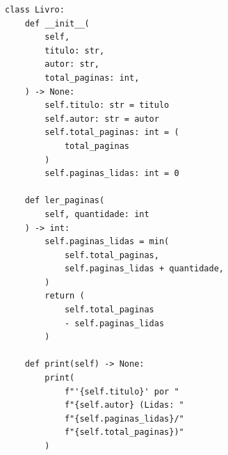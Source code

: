 \ifmostrarGabarito
\begin{verbatim}
class Livro:
    def __init__(
        self,
        titulo: str,
        autor: str,
        total_paginas: int,
    ) -> None:
        self.titulo: str = titulo
        self.autor: str = autor
        self.total_paginas: int = (
            total_paginas
        )
        self.paginas_lidas: int = 0

    def ler_paginas(
        self, quantidade: int
    ) -> int:
        self.paginas_lidas = min(
            self.total_paginas,
            self.paginas_lidas + quantidade,
        )
        return (
            self.total_paginas
            - self.paginas_lidas
        )

    def print(self) -> None:
        print(
            f"'{self.titulo}' por "
            f"{self.autor} (Lidas: "
            f"{self.paginas_lidas}/"
            f"{self.total_paginas})"
        )
\end{verbatim}

\fi
